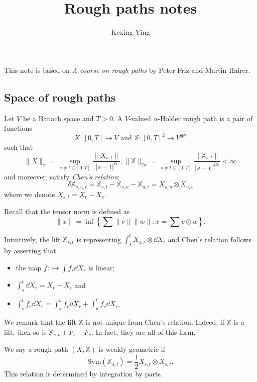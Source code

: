 \documentclass[]{article}
\theoremstyle{definition}
\theoremstyle{definition}
\begin{document}
\title{Rough paths notes}
\author{Kexing Ying}
\maketitle

This note is based on \textit{A course on rough paths} by Peter Friz and Martin Hairer. 

\subsection*{Space of rough paths}

Let \(V\) be a Banach space and \(T > 0\). A \(V\)-valued \(\alpha\)-H\"older rough path is a pair of functions
\[X : [0, T] \to V \text{ and } \mathbb{X} : [0, T]^2 \to V^{\otimes 2}\]
such that 
\[\|X\|_\alpha = \sup_{s \neq t \in [0, T]}\frac{\|X_{s, t}\|}{|s - t|^\alpha}, 
  \|\mathbb{X}\|_{2\alpha} = \sup_{s \neq t \in [0, T]} \frac{\|\mathbb{X}_{s, t}\|}{|s - t|^{2\alpha}} < \infty\]
and moreover, satisfy \textit{Chen's relation}:
\begin{equation}\label{eq:chen}
  \delta \mathbb{X}_{s, u, t} = \mathbb{X}_{s, t} - \mathbb{X}_{s, u} - \mathbb{X}_{u, t} = X_{s, u} \otimes X_{u, t}
\end{equation}
where we denote \(X_{s, t} = X_t - X_s\).

Recall that the tensor norm is defined as 
\[\|x\| = \inf \left\{\sum \|v\|\|w\| : x = \sum v \otimes w\right\}.\]

Intuitively, the lift \(\mathbb{X}_{s, t}\) is representing \(\int_s^t X_{s, r} \otimes \dd X_r\) and 
Chen's relation follows by asserting that 
\begin{itemize}
  \item the map \(f : \mapsto \int f_r \dd X_r\) is linear;
  \item \(\int_s^t \dd X_r = X_t - X_s\) and
  \item \(\int_s^t f_r \dd X_r = \int_s^u f_r \dd X_r + \int_u^t f_r \dd X_r\).
\end{itemize}

We remark that the lift \(\mathbb{X}\) is not unique from Chen's relation. Indeed, if \(\mathbb{X}\) is a lift, 
then so is \(\mathbb{X}_{s, t} + F_t - F_s\). In fact, they are all of this form. 

We say a rough path \((X, \mathbb{X})\) is weakly geometric if 
\[\text{Sym}(\mathbb{X}_{s, t}) = \frac{1}{2}X_{s, t} \otimes X_{s, t}.\]
This relation is determined by integration by parts.
\end{document}
